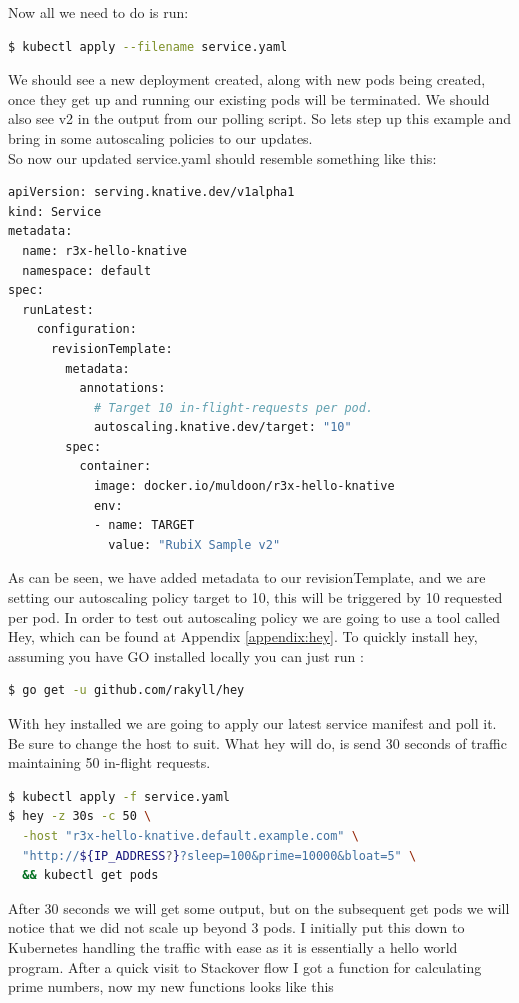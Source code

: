 Now all we need to do is run:
\begin{lstlisting}[language=bash]
$ kubectl apply --filename service.yaml
\end{lstlisting}
We should see a new deployment created, along with new pods being created, once they get up and running our existing pods will be terminated. We should also see v2 in the output from our polling script. So lets step up this example and bring in some autoscaling policies to our updates.
\\ So now our updated service.yaml should resemble something like this:
\begin{lstlisting}[language=bash]
apiVersion: serving.knative.dev/v1alpha1
kind: Service
metadata:
  name: r3x-hello-knative
  namespace: default
spec:
  runLatest:
    configuration:
      revisionTemplate:
        metadata:
          annotations:
            # Target 10 in-flight-requests per pod.
            autoscaling.knative.dev/target: "10"
        spec:
          container:
            image: docker.io/muldoon/r3x-hello-knative
            env:
            - name: TARGET
              value: "RubiX Sample v2"
\end{lstlisting}
As can be seen, we have added metadata to our revisionTemplate, and we are setting our autoscaling policy target to 10, this will be triggered by 10 requested per pod. In order to test out autoscaling policy we are going to use a tool called Hey, which can be found at Appendix \ref{appendix:hey}. To quickly install hey, assuming you have GO installed locally you can just run :
\begin{lstlisting}[language=bash]
$ go get -u github.com/rakyll/hey
\end{lstlisting}
With hey installed we are going to apply our latest service manifest and poll it. Be sure to change the host to suit. What hey will do, is send 30 seconds of traffic maintaining 50 in-flight requests.
\begin{lstlisting}[language=bash]
$ kubectl apply -f service.yaml
$ hey -z 30s -c 50 \
  -host "r3x-hello-knative.default.example.com" \
  "http://${IP_ADDRESS?}?sleep=100&prime=10000&bloat=5" \
  && kubectl get pods
\end{lstlisting}
After 30 seconds we will get some output, but on the subsequent get pods we will notice that we did not scale up beyond 3 pods. I initially put this down to Kubernetes handling the traffic with ease as it is essentially a hello world program. After a quick visit to Stackover flow I got a function for calculating prime numbers, now my new functions looks like this
